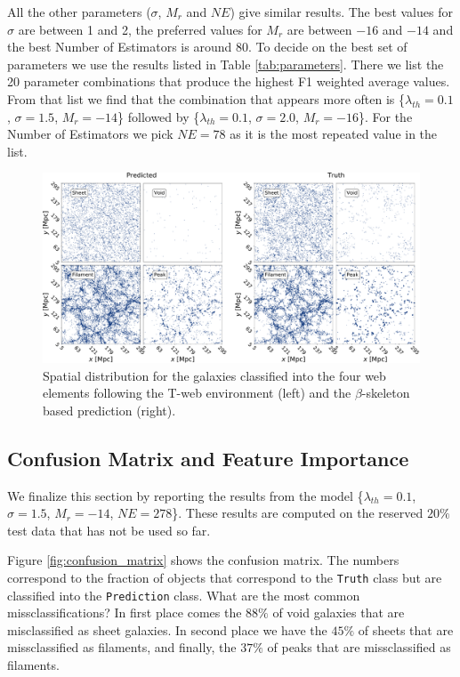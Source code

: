 \documentclass[usenatbib]{mnras}
\begin{document}
All the other parameters ($\sigma$, $M_r$ and $NE$) give similar
results. 
The best values for $\sigma$ are between 1 and 2, the preferred values
for $M_r$ are between $-16$ and $-14$ and the best Number of
Estimators is around $80$.
To decide on the best set of parameters we use the results listed in
Table \ref{tab:parameters}.
There we list the 20 parameter combinations that
produce the highest F1 weighted average values.
From that list we find that the combination that appears more often is 
\{$\lambda_{th}=0.1$, $\sigma=1.5$, $M_r=-14$\} followed by 
\{$\lambda_{th}=0.1$, $\sigma=2.0$, $M_r=-16$\}.
For the Number of Estimators we pick $NE=78$ as it is the most
repeated value in the list.

\begin{figure}
  \centering 
    \includegraphics[scale=0.28]{Figs/p_environment_predicted.pdf}
    \caption{Spatial distribution for the galaxies classified into the
      four web elements following the T-web environment (left) and 
      the $\beta$-skeleton based prediction (right).} 
    \label{fig:prediction}
\end{figure}


\subsection{Confusion Matrix and Feature Importance}

We finalize this section by reporting the results from the model 
\{$\lambda_{th}=0.1$, $\sigma=1.5$, $M_r=-14$, $NE=278$\}.
These results are computed on the reserved $20\%$ test data that has
not be used so far.

Figure \ref{fig:confusion_matrix} shows the confusion matrix.
The numbers correspond to the fraction of objects that correspond to
the \verb"Truth" class but are classified into the \verb"Prediction"
class.
What are the most common missclassifications?
In first place comes the $88\%$ of void galaxies that are misclassified
as sheet galaxies.  
In second place we have the $45\%$ of sheets that are missclassified
as filaments, and finally, the $37\%$ of peaks that are missclassified
as filaments.
\end{document}
